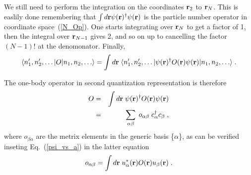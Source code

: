 We still need to perform the integration on the coordinates ${\bf r}_2$ to ${\bf r}_N$. This is easlily done remembering that $\int d{\bf r} \psi({\bf r})^\dag \psi({\bf r})$ is the particle number operator in coordinate space~(\ref{N_Op}). One starts integrating over ${\bf r}_N$ to get a factor of 1, then the integral over ${\bf r}_{N-1}$ gives 2, and so on up to cancelling the factor $(N-1)!$ at the denomonator. Finally,
\begin{equation}
 \langle n'_1, n'_2, \ldots \vert {O} \vert n_1, n_2, \ldots  \rangle = \int d{\bf r} \;
  \langle n'_1, n'_2, \ldots \vert 
   \psi({\bf r})^\dag O({\bf r}) \psi({\bf r}) 
    \vert n_1, n_2, \ldots  \rangle \; .
\end{equation}

The one-body operator in second quantization representation is therefore 
\begin{eqnarray}
 {O} &=& \int d{\bf r}  \; \psi({\bf r})^\dag O({\bf r}) \psi({\bf r})
\nonumber \\
  &=& \sum_{\alpha \beta } \; o_{\alpha \beta} \; c^\dag_\alpha c_\beta \; ,
\label{O1SecQuant}
\end{eqnarray}
where $o_{\beta \alpha}$ are the metrix elements in the generic basis \{$\alpha$\}, as can be verified inseting Eq.~(\ref{psi_vs_a}) in the latter equation
\begin{equation}
 o_{\alpha \beta} = \int d{\bf r} \; u^*_{\alpha}({\bf r}) O({\bf r}) u_{\beta}({\bf r})  \; .
\label{O1me} \\
\end{equation}

